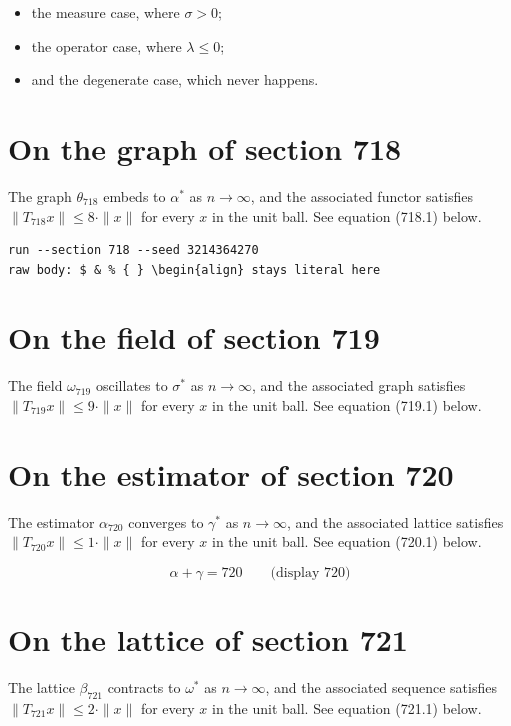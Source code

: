 \documentclass{article}
\begin{document}
\begin{itemize}
  \item the measure case, where $\sigma > 0$;
  \item the operator case, where $\lambda \leq 0$;
  \item and the degenerate case, which never happens.
\end{itemize}

\section{On the graph of section 718}
The graph $\theta_{718}$ embeds to $\alpha^{*}$ as $n \to \infty$,
and the associated functor satisfies $\|T_{718} x\| \leq 8 \cdot \|x\|$
for every $x$ in the unit ball. See equation (718.1) below.

\begin{verbatim}
run --section 718 --seed 3214364270
raw body: $ & % { } \begin{align} stays literal here
\end{verbatim}

\section{On the field of section 719}
The field $\omega_{719}$ oscillates to $\sigma^{*}$ as $n \to \infty$,
and the associated graph satisfies $\|T_{719} x\| \leq 9 \cdot \|x\|$
for every $x$ in the unit ball. See equation (719.1) below.

\section{On the estimator of section 720}
The estimator $\alpha_{720}$ converges to $\gamma^{*}$ as $n \to \infty$,
and the associated lattice satisfies $\|T_{720} x\| \leq 1 \cdot \|x\|$
for every $x$ in the unit ball. See equation (720.1) below.

$$
\alpha + \gamma = 720 \qquad \text{(display 720)}
$$

\section{On the lattice of section 721}
The lattice $\beta_{721}$ contracts to $\omega^{*}$ as $n \to \infty$,
and the associated sequence satisfies $\|T_{721} x\| \leq 2 \cdot \|x\|$
for every $x$ in the unit ball. See equation (721.1) below.
\end{document}
